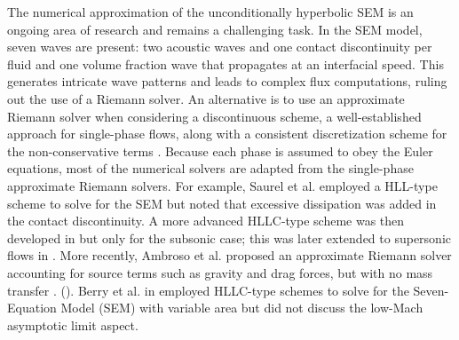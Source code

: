 \documentclass[preprint,10pt]{elsarticle}
\begin{document}
The numerical approximation of the unconditionally hyperbolic SEM is an ongoing area of research and remains a challenging task. In the SEM model, seven waves are present: two acoustic waves and one contact discontinuity per fluid and one volume fraction wave that propagates 
at an interfacial speed. This generates intricate wave patterns and leads to complex flux computations, ruling out the use of a Riemann solver. An alternative is to use an approximate Riemann solver when considering a discontinuous scheme, a well-established approach for single-phase flows, along with a consistent discretization scheme for the non-conservative terms \cite{Li_2004,Abgrall_2002}. 
% 
Because each phase is assumed to obey the Euler equations, most of the numerical solvers are adapted from the single-phase approximate Riemann solvers. For example, Saurel et al.\cite{Saurel_2001a, Saurel_2001b} employed a HLL-type scheme to solve for the SEM but noted that excessive dissipation was added in the contact discontinuity. A more advanced HLLC-type scheme was then developed in \cite{Li_2004} but only for the subsonic case; this was later extended to supersonic flows in \cite{Zein_2010}. More recently, Ambroso et al. \cite{Ambroso_2012} proposed an approximate Riemann solver accounting for source terms such as gravity and drag forces, but with no mass transfer .  (). 
Berry et al. in \cite{Berry_NED2010} employed HLLC-type schemes to solve for the Seven-Equation Model (SEM) with variable area but did not discuss the low-Mach asymptotic limit aspect. 
\end{document}
